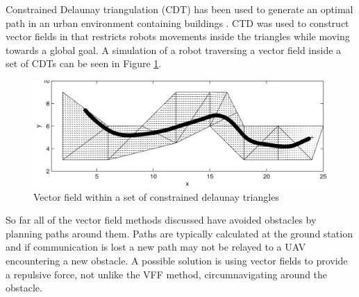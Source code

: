 \documentclass[numbered,pdftex]{ohio-etd}
\begin{document}
Constrained Delaunay triangulation (CDT) has been used to generate an optimal path in an urban environment containing buildings \cite{md_simplex_2017}. CTD was used to construct vector fields in \cite{pimenta_fully_2007} that restricts robots movements inside the triangles while moving towards a global goal. A simulation of a robot traversing a vector field inside a set of CDTs can be seen in Figure \ref{fig:cdtVF}.

\begin{figure}
	\centering
	\includegraphics[width=15cm]{PaperFigures/cdtVF}
	\caption{Vector field within a set of constrained delaunay triangles \cite{pimenta_fully_2007}}
	\label{fig:cdtVF}
\end{figure}


So far all of the vector field methods discussed have avoided obstacles by planning paths around them. Paths are typically calculated at the ground station and if communication is lost a new path may not be relayed to a UAV encountering a new obstacle. A possible solution is using vector fields to provide a repulsive force, not unlike the VFF method, circumnavigating around the obstacle. 



\end{document}
